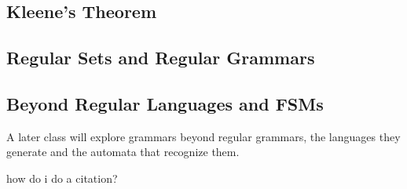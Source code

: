     \subsection {Kleene's Theorem}
    \subsection {Regular Sets and Regular Grammars}
    \subsection {Beyond Regular Languages and FSMs}
A later class will explore grammars beyond regular grammars, the languages they generate and the automata that recognize them.


how do i do a citation? %


\newpage